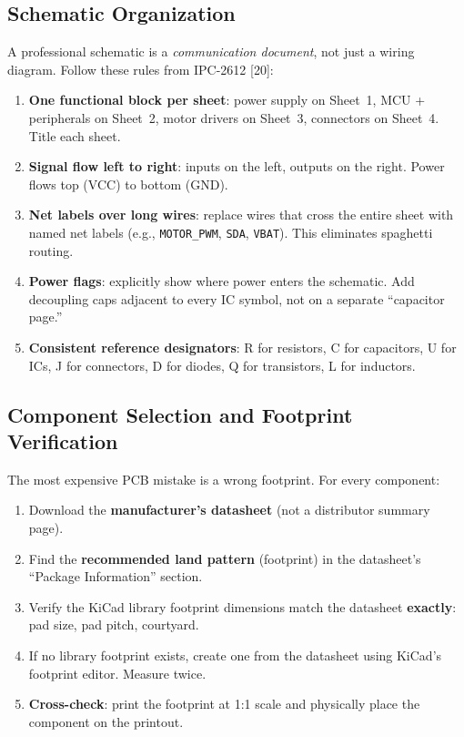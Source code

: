 \documentclass[11pt,letterpaper,twoside,openany]{book}
\begin{document}
\subsection{Schematic Organization}
A professional schematic is a \emph{communication document}, not just a wiring diagram. Follow these rules from IPC-2612 [20]:
\begin{enumerate}[nosep,leftmargin=1.5em]
\item \textbf{One functional block per sheet}: power supply on Sheet~1, MCU + peripherals on Sheet~2, motor drivers on Sheet~3, connectors on Sheet~4. Title each sheet.
\item \textbf{Signal flow left to right}: inputs on the left, outputs on the right. Power flows top (VCC) to bottom (GND).
\item \textbf{Net labels over long wires}: replace wires that cross the entire sheet with named net labels (e.g., \texttt{MOTOR\_PWM}, \texttt{SDA}, \texttt{VBAT}). This eliminates spaghetti routing.
\item \textbf{Power flags}: explicitly show where power enters the schematic. Add decoupling caps adjacent to every IC symbol, not on a separate ``capacitor page.''
\item \textbf{Consistent reference designators}: R for resistors, C for capacitors, U for ICs, J for connectors, D for diodes, Q for transistors, L for inductors.
\end{enumerate}

\subsection{Component Selection and Footprint Verification}
The most expensive PCB mistake is a wrong footprint. For every component:
\begin{enumerate}[nosep,leftmargin=1.5em]
\item Download the \textbf{manufacturer's datasheet} (not a distributor summary page).
\item Find the \textbf{recommended land pattern} (footprint) in the datasheet's ``Package Information'' section.
\item Verify the KiCad library footprint dimensions match the datasheet \textbf{exactly}: pad size, pad pitch, courtyard.
\item If no library footprint exists, create one from the datasheet using KiCad's footprint editor. Measure twice.
\item \textbf{Cross-check}: print the footprint at 1:1 scale and physically place the component on the printout.
\end{enumerate}
\end{document}
